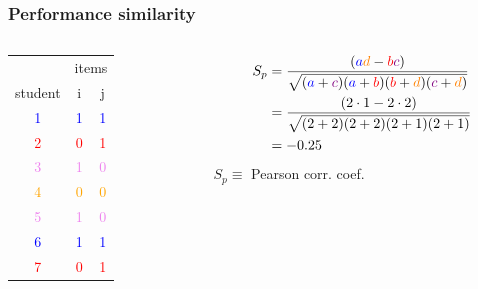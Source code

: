 \documentclass[bigger, aspectratio=169]{beamer}
\begin{document}
\begin{frame}
	\frametitle{Performance similarity}
	
	\begin{columns}[T] %
		\begin{column}{.48\textwidth}
			\begin{center}	
				\begin{tabular}{ccc}
					\toprule
					& \multicolumn{2}{c}{items}\\
					student & i & j \\
					\midrule
					\textcolor{blue}{1} & \textcolor{blue}{1} & \textcolor{blue}{1} \\
					\textcolor{red}{2} & \textcolor{red}{0} & \textcolor{red}{1} \\
					\textcolor{violet}{3} & \textcolor{violet}{1} & \textcolor{violet}{0} \\
					\textcolor{orange}{4} & \textcolor{orange}{0} & \textcolor{orange}{0} \\
					\textcolor{violet}{5} & \textcolor{violet}{1} & \textcolor{violet}{0} \\
					\textcolor{blue}{6} & \textcolor{blue}{1} & \textcolor{blue}{1} \\
					\textcolor{red}{7} & \textcolor{red}{0} & \textcolor{red}{1} \\
					\bottomrule
				\end{tabular}
			\end{center}
		\end{column}%
		\hfill%
		\begin{column}{.48\textwidth}
			\bigskip \bigskip \bigskip
			\centering
			\begin{align*}
			S_p &= \frac{({\color{blue}a}{\color{orange}d} - {\color{red}b}{\color{violet}c} 
			)}{\sqrt{({\color{blue}a}+{\color{violet}c})({\color{blue}a}+{\color{red}b})({\color{red}b}+{\color{orange}d})({\color{violet}c}+{\color{orange}d})}}
			 \\ 
			& = \frac{(2 \cdot 1 - 2 \cdot 2)}{\sqrt{(2+2)(2+2)(2+1)(2+1)}} \\
			&= -0.25
			\end{align*}
			$S_p \equiv$ Pearson corr. coef. 
		\end{column}%
	\end{columns}
	
	
\end{frame}
\end{document}
